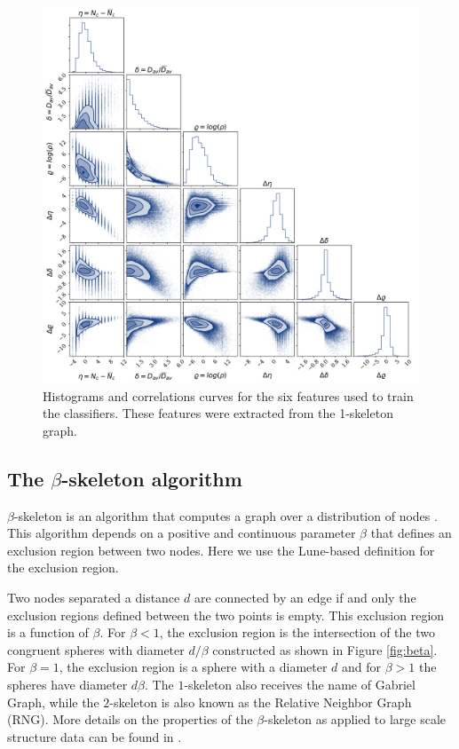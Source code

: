 \documentclass[usenatbib]{mnras}
\begin{document}
\begin{figure}
        \includegraphics[scale=0.46]{Figs/p_all_features_correlations.pdf}
    \caption{Histograms and correlations curves for the six features
      used to train the classifiers. These features were extracted from the 1-skeleton graph.}
    \label{fig:features}
\end{figure}

\subsection{The $\beta$-skeleton algorithm}


$\beta$-skeleton is an algorithm that computes a graph over a
distribution of nodes \citep{Kirkpatrick1985}.  
This algorithm depends on a positive and continuous parameter $\beta$
that defines an exclusion region between two nodes.
Here we use the Lune-based definition for the exclusion region.

Two nodes separated a distance $d$ are connected by an edge if and only the exclusion regions defined between the two points is empty.
This exclusion region is a function of $\beta$.
For $\beta<1$, the exclusion region is the intersection of the two  
congruent spheres with diameter $d/\beta$ constructed as shown in Figure \ref{fig:beta}.
For  $\beta=1$, the exclusion region is a sphere with a diameter $d$ and for $\beta>1$ the spheres have diameter $d\beta$.
The $1$-skeleton also receives the name of Gabriel Graph, while the
 $2$-skeleton is also known as the Relative Neighbor Graph (RNG).
More details on the properties of the $\beta$-skeleton as applied to large scale structure data can be found in \cite{Fang2019}.
\end{document}
